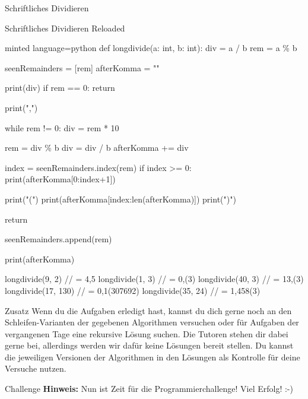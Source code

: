\begin{task}[points=auto]{Schriftliches Dividieren}
\begin{subtask*}[points=0]{Schriftliches Dividieren Reloaded }
        \begin{solution}
            \begin{codeBlock}[]{minted language=python}
                def longdivide(a: int, b: int):
                    div = a / b
                    rem = a \% b

                    seenRemainders = [rem]
                    afterKomma = ""

                    print(div)
                    if rem == 0:
                        return

                    print(",")

                    while rem != 0:
                        div = rem * 10

                        rem = div \% b
                        div = div / b
                        afterKomma += div

                        index = seenRemainders.index(rem)
                        if index >= 0:
                            print(afterKomma[0:index+1])

                            print("(")
                            print(afterKomma[index:len(afterKomma)])
                            print(")")

                            return

                        seenRemainders.append(rem)

                    print(afterKomma)

                longdivide(9, 2) // = 4,5
                longdivide(1, 3) // = 0,(3)
                longdivide(40, 3) // = 13,(3)
                longdivide(17, 130) // = 0,1(307692)
                longdivide(35, 24) // = 1,458(3)
            \end{codeBlock}
        \end{solution}
    \end{subtask*}
\end{task}
\begin{task}[points=auto]{Zusatz}
    Wenn du die Aufgaben erledigt hast, kannst du dich gerne noch an den Schleifen-Varianten der gegebenen Algorithmen versuchen oder für Aufgaben der vergangenen Tage eine rekursive Lösung suchen. Die Tutoren stehen dir dabei gerne bei, allerdings werden wir dafür keine Lösungen bereit stellen. Du kannst die jeweiligen Versionen der Algorithmen in den Lösungen als Kontrolle für deine Versuche nutzen.
\end{task}
\begin{task}[points=auto]{Challenge}
    \large \textbf{Hinweis:} Nun ist Zeit für die Programmierchallenge! Viel Erfolg! :-)
\end{task}

